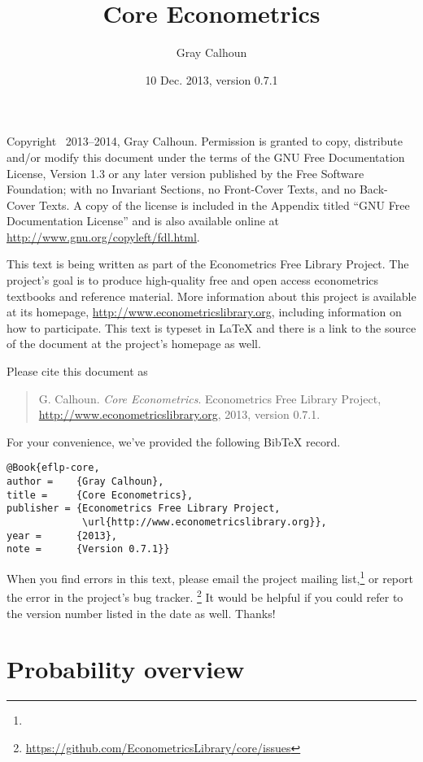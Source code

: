 \documentclass[12pt,notitlepage]{report}
\title{Core Econometrics}
\author{Gray Calhoun}
\date{10 Dec. 2013, version 0.7.1}
\begin{document}
\maketitle

\bigskip\noindent%
Copyright \textcopyright\ 2013--2014, Gray Calhoun.
Permission is granted to copy, distribute and/or modify this document
under the terms of the GNU Free Documentation License, Version 1.3 or
any later version published by the Free Software Foundation; with no
Invariant Sections, no Front-Cover Texts, and no Back-Cover Texts.  A
copy of the license is included in the Appendix titled ``GNU Free
Documentation License'' and is also available online at
\url{http://www.gnu.org/copyleft/fdl.html}.

This text is being written as part of the Econometrics Free Library
Project.  The project's goal is to produce high-quality free and
open access econometrics textbooks and reference material.  More
information about this project is available at its homepage,
\url{http://www.econometricslibrary.org}, including information on how
to participate.  This text is typeset in LaTeX and there is a link
to the source of the document at the project's homepage as well.

Please cite this document as
\begin{quote}\raggedright
  G. Calhoun. \textit{Core Econometrics}. Econometrics Free Library
  Project, \url{http://www.econometricslibrary.org}, 2013, version
  0.7.1.
\end{quote}
For your convenience, we've provided the following BibTeX record.
\begin{Verbatim}
@Book{eflp-core,
author =    {Gray Calhoun},
title =     {Core Econometrics},
publisher = {Econometrics Free Library Project,
             \url{http://www.econometricslibrary.org}},
year =      {2013},
note =      {Version 0.7.1}}
\end{Verbatim}
When you find errors in this text, please email the project mailing
list,\footnote{} or report
the error in the project's bug tracker.%
\footnote{\url{https://github.com/EconometricsLibrary/core/issues}}
It would be helpful if you could refer to the version number listed in
the date as well.  Thanks!

\tableofcontents

\chapter{Probability overview}





\end{document}
